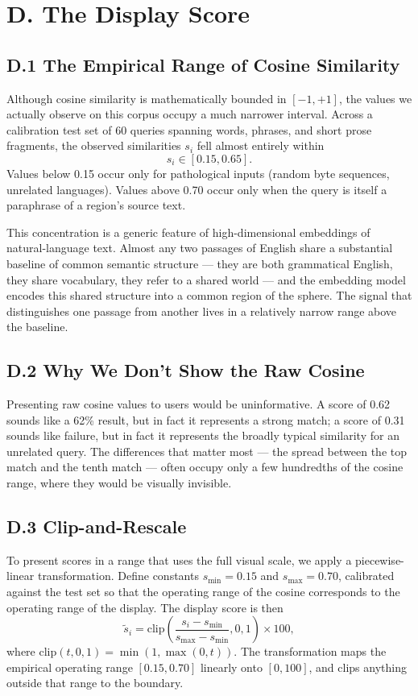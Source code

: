 \documentclass[11pt]{article}
\begin{document}
\section*{D. The Display Score}

\subsection*{D.1 The Empirical Range of Cosine Similarity}
Although cosine similarity is mathematically bounded in $[-1, +1]$, the values we actually observe on this corpus occupy a much narrower interval. Across a calibration test set of 60 queries spanning words, phrases, and short prose fragments, the observed similarities $s_i$ fell almost entirely within
\[
s_i \in [0.15, 0.65].
\]
Values below 0.15 occur only for pathological inputs (random byte sequences, unrelated languages). Values above 0.70 occur only when the query is itself a paraphrase of a region's source text.

This concentration is a generic feature of high-dimensional embeddings of natural-language text. Almost any two passages of English share a substantial baseline of common semantic structure --- they are both grammatical English, they share vocabulary, they refer to a shared world --- and the embedding model encodes this shared structure into a common region of the sphere. The signal that distinguishes one passage from another lives in a relatively narrow range above the baseline.

\subsection*{D.2 Why We Don't Show the Raw Cosine}
Presenting raw cosine values to users would be uninformative. A score of 0.62 sounds like a 62\% result, but in fact it represents a strong match; a score of 0.31 sounds like failure, but in fact it represents the broadly typical similarity for an unrelated query. The differences that matter most --- the spread between the top match and the tenth match --- often occupy only a few hundredths of the cosine range, where they would be visually invisible.

\subsection*{D.3 Clip-and-Rescale}
To present scores in a range that uses the full visual scale, we apply a piecewise-linear transformation. Define constants $s_{\min} = 0.15$ and $s_{\max} = 0.70$, calibrated against the test set so that the operating range of the cosine corresponds to the operating range of the display. The display score is then
\[
\tilde{s}_i = \mathrm{clip}\!\left(\frac{s_i - s_{\min}}{s_{\max} - s_{\min}}, 0, 1\right) \times 100,
\]
where $\mathrm{clip}(t, 0, 1) = \min(1, \max(0, t))$. The transformation maps the empirical operating range $[0.15, 0.70]$ linearly onto $[0, 100]$, and clips anything outside that range to the boundary.
\end{document}
